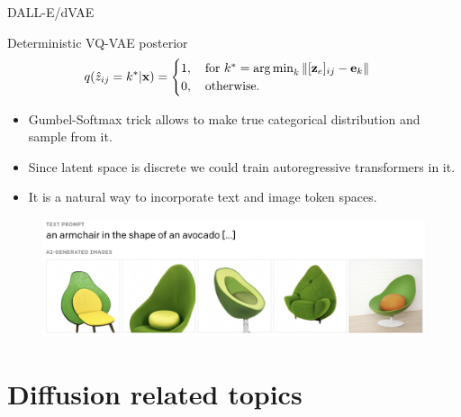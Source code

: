 \documentclass{beamer}
\begin{document}
\begin{frame}{DALL-E/dVAE}
	\begin{block}{Deterministic VQ-VAE posterior}
		\vspace{-0.3cm}
		\[
			q(\hat{z}_{ij} = k^* | \mathbf{x}) = \begin{cases}
				1 , \quad \text{for } k^* = \operatorname*{arg\,min}_k \| [\mathbf{z}_e]_{ij} - \mathbf{e}_k \| \\
				0, \quad \text{otherwise}.
			\end{cases}
		\]
		\vspace{-0.3cm}
	\end{block}
	\begin{itemize}
		\item Gumbel-Softmax trick allows to make true categorical distribution and sample from it.
		\item Since latent space is discrete we could train autoregressive transformers in it.
		\item It is a natural way to incorporate text and image token spaces.
	\end{itemize}
	\begin{figure}
		\includegraphics[width=\linewidth]{figs/dalle}
	\end{figure}
\end{frame}
\section{Diffusion related topics}
\end{document}
